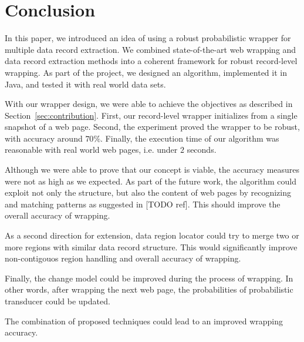 \chapter{Conclusion}


In this paper, we introduced an idea of using a robust probabilistic wrapper for multiple data record extraction. We combined state-of-the-art web wrapping and data record extraction methods into a coherent framework for robust record-level wrapping. As part of the project, we designed an algorithm, implemented it in Java, and tested it with real world data sets.


With our wrapper design, we were able to achieve the objectives as described in Section~\ref{sec:contribution}. First, our record-level wrapper initializes from a single snapshot of a web page. Second, the experiment proved the wrapper to be robust, with accuracy around $70\%$. Finally, the execution time of our algorithm was reasonable with real world web pages, i.e. under $2$ seconds.



Although we were able to prove that our concept is viable, the accuracy measures were not as high as we expected. As part of the future work, the algorithm could exploit not only the structure, but also the content of web pages by recognizing and matching patterns as suggested in [TODO ref]. This should improve the overall accuracy of wrapping.

As a second direction for extension, data region locator could try to merge two or more regions with similar data record structure. This would significantly improve non-contigouos region handling and overall accuracy of wrapping.

Finally, the change model could be improved during the process of wrapping. In other words, after wrapping the next web page, the probabilities of probabilistic transducer could be updated.

The combination of proposed techniques could lead to an improved wrapping accuracy.


